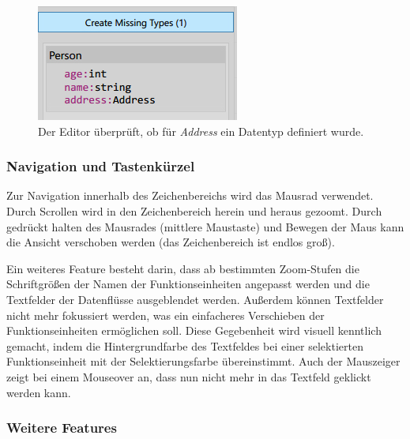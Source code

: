 	\begin{figure}[H]
		\centering
		\includegraphics[width=0.4\linewidth]{./img/datatypes.jpg} 
		\caption{Der Editor überprüft, ob für \textit{Address} ein Datentyp definiert wurde.}
	\end{figure}
	
		

	
\subsubsection{Navigation und Tastenkürzel}

	Zur Navigation innerhalb des Zeichenbereichs wird das Mausrad verwendet.
	Durch Scrollen wird in den Zeichenbereich herein und heraus gezoomt.
	Durch gedrückt halten des Mausrades (mittlere Maustaste) und Bewegen der
	Maus kann die Ansicht verschoben werden (das Zeichenbereich ist endlos groß).
	
	Ein weiteres Feature besteht darin, dass ab bestimmten Zoom-Stufen die
	Schriftgrößen der Namen der Funktionseinheiten angepasst werden und die 
	Textfelder der Datenflüsse ausgeblendet werden.
	Außerdem können Textfelder nicht mehr fokussiert werden, was ein einfacheres
	Verschieben der Funktionseinheiten ermöglichen soll. Diese Gegebenheit wird
	visuell kenntlich gemacht, indem die Hintergrundfarbe des Textfeldes bei
	einer selektierten Funktionseinheit mit der Selektierungsfarbe übereinstimmt.
	Auch der Mauszeiger zeigt bei einem Mouseover an, dass nun nicht mehr in
	das Textfeld geklickt werden kann.
	
	
	\subsubsection{Weitere Features}

